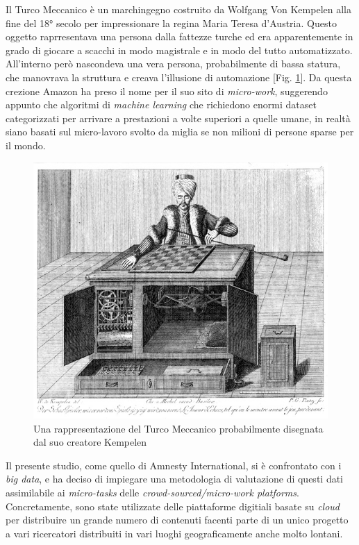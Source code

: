 Il Turco Meccanico è un marchingegno costruito da Wolfgang Von Kempelen alla fine del 18° secolo per impressionare la regina Maria Teresa d'Austria. Questo oggetto raprresentava una persona dalla fattezze turche ed era apparentemente in grado di giocare a scacchi in modo magistrale e in modo del tutto automatizzato. All'interno però nascondeva una vera persona, probabilmente di bassa statura, che manovrava la struttura e creava l'illusione di automazione [Fig. \ref{fig:turco}]. Da questa crezione Amazon ha preso il nome per il suo sito di \textit{micro-work}, suggerendo appunto che algoritmi di \textit{machine learning} che richiedono enormi dataset categorizzati per arrivare a prestazioni a volte superiori a quelle umane, in realtà siano basati sul micro-lavoro svolto da miglia se non milioni di persone sparse per il mondo.  
\begin{figure}
	\centering
	\includegraphics[width=\textwidth]{figures/turco}
	\caption{Una rappresentazione del Turco Meccanico probabilmente disegnata dal suo creatore Kempelen}
	\label{fig:turco}
\end{figure}

Il presente studio, come quello di Amnesty International, si è confrontato con i \textit{big data}, e ha deciso di impiegare una metodologia di valutazione di questi dati assimilabile ai \textit{micro-tasks} delle \textit{crowd-sourced/micro-work platforms}. Concretamente, sono state utilizzate delle piattaforme digitiali basate su \textit{cloud} per distribuire un grande numero di contenuti facenti parte di un unico progetto a vari ricercatori distribuiti in vari luoghi geograficamente anche molto lontani. 

